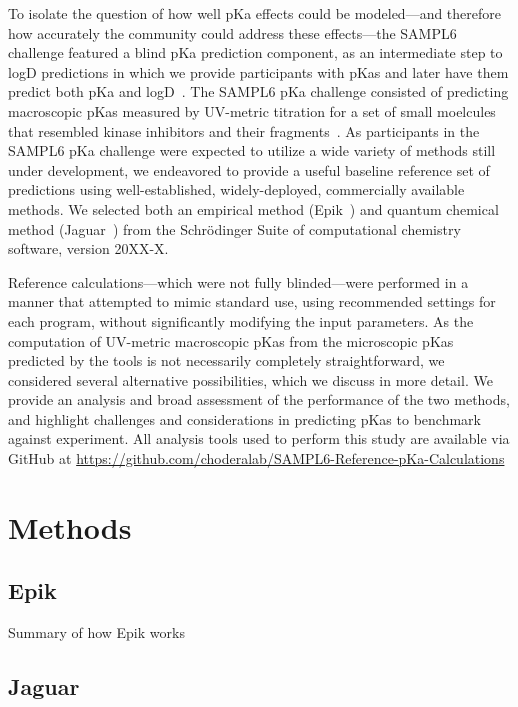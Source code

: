 \documentclass[9pt,lineno,final]{elife}
\begin{document}
To isolate the question of how well pKa effects could be modeled---and therefore how accurately the community could address these effects---the SAMPL6 challenge featured a blind pKa prediction component, as an intermediate step to logD predictions in which we provide participants with pKas and later have them predict both pKa and logD~\cite{sampl6-pKa-measurements}.
The SAMPL6 pKa challenge consisted of predicting macroscopic pKas measured by UV-metric titration for a set of small moelcules that resembled kinase inhibitors and their fragments~\cite{sampl6-pKa-measurements}.
As participants in the SAMPL6 pKa challenge were expected to utilize a wide variety of methods still under development, we endeavored to provide a useful baseline reference set of predictions using well-established, widely-deployed, commercially available methods.
We selected both an empirical method (Epik~\cite{Shelley:J.Comput.AidedMol.Des.:2007b}) and quantum chemical method (Jaguar~\cite{Bochevarov:Int.J.QuantumChem.:2013}) from the Schr\"{o}dinger Suite of computational chemistry software, version 20XX-X.

Reference calculations---which were not fully blinded---were performed in a manner that attempted to mimic standard use, using recommended settings for each program, without significantly modifying the input parameters.
As the computation of UV-metric macroscopic pKas from the microscopic pKas predicted by the tools is not necessarily completely straightforward, we considered several alternative possibilities, which we discuss in more detail.
We provide an analysis and broad assessment of the performance of the two methods, and highlight challenges and considerations in predicting pKas to benchmark against experiment.
All analysis tools used to perform this study are available via GitHub at
\url{https://github.com/choderalab/SAMPL6-Reference-pKa-Calculations}

\section{Methods}
\subsection{Epik}
Summary of how Epik works 

\subsection{Jaguar}
\end{document}
